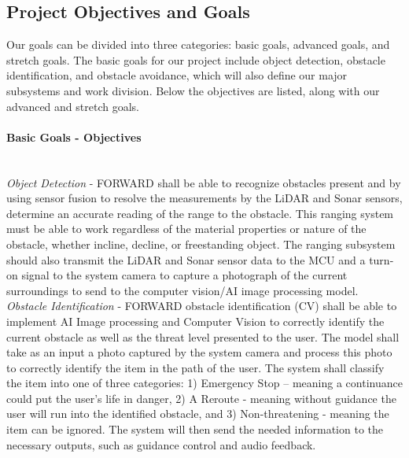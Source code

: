 \subsection{Project Objectives and Goals}
\indent Our goals can be divided into three categories: basic goals, advanced goals, and stretch goals. The basic goals for our project include object detection, obstacle identification, and obstacle avoidance, which will also define our major subsystems and work division. Below the objectives are listed, along with our advanced and stretch goals. 
\\


\paragraph{Basic Goals - Objectives} 

\noindent \\ \textit{Object Detection} - FORWARD shall be able to recognize obstacles present and by using sensor fusion to resolve the measurements by the LiDAR and Sonar sensors, determine an accurate reading of the range to the obstacle. This ranging system must be able to work regardless of the material properties or nature of the obstacle, whether incline, decline, or freestanding object. The ranging subsystem should also transmit the LiDAR and Sonar sensor data to the MCU and a turn-on signal to the system camera to capture a photograph of the current surroundings to send to the computer vision/AI image processing model. 
\\


\noindent \textit{Obstacle Identification} - FORWARD obstacle identification (CV) shall be able to implement AI Image processing and Computer Vision to correctly identify the current obstacle as well as the threat level presented to the user. The model shall take as an input a photo captured by the system camera and process this photo to correctly identify the item in the path of the user. The system shall classify the item into one of three categories: 1) Emergency Stop – meaning a continuance could put the user’s life in danger, 2) A Reroute - meaning without guidance the user will run into the identified obstacle, and 3) Non-threatening - meaning the item can be ignored. The system will then send the needed information to the necessary outputs, such as guidance control and audio feedback. 
\\


